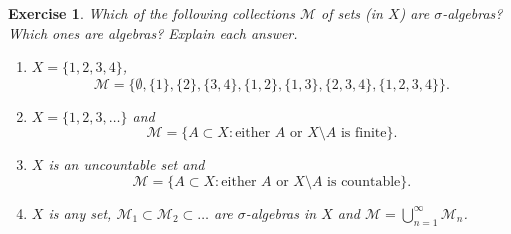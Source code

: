\documentclass{article}
\newtheorem{exercise}[theorem]{Exercise}
\begin{document}
\begin{exercise}
    Which of the following collections $\mathcal{M}$ of sets (in $X$) are $\sigma$-algebras? Which ones are algebras? Explain each answer.
    \begin{enumerate}
        \item $X = \{1, 2, 3, 4\}$, 
        \[
        \mathcal{M} = \{\emptyset, \{1\}, \{2\}, \{3, 4\}, \{1, 2\}, \{1, 3\}, \{2, 3, 4\}, \{1, 2, 3, 4\}\}.
        \]
        \item $X = \{1, 2, 3, \ldots \}$ and 
        \[
        \mathcal{M} = \{A \subset X : \text{either } A \text{ or } X \setminus A \text{ is finite}\}.
        \]
        \item $X$ is an uncountable set and 
        \[
        \mathcal{M} = \{A \subset X : \text{either } A \text{ or } X \setminus A \text{ is countable}\}.
        \]
        \item $X$ is any set, $\mathcal{M}_1 \subset \mathcal{M}_2 \subset \ldots$ are $\sigma$-algebras in $X$ and $\mathcal{M} = \bigcup_{n=1}^{\infty} \mathcal{M}_n$.
    \end{enumerate}
\end{exercise}
\end{document}
